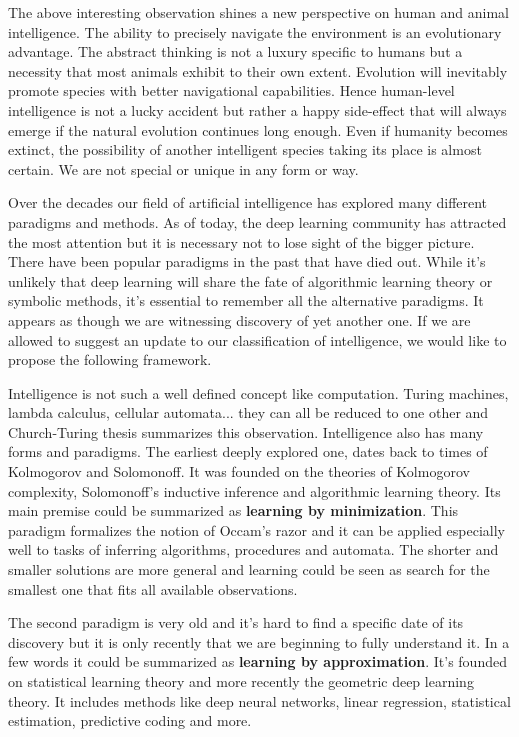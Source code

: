 \documentclass[12pt]{article}
\begin{document}
The above interesting observation shines a new perspective on human and animal intelligence. The ability to precisely navigate the environment is an evolutionary advantage. The abstract thinking is not a luxury specific to humans but a necessity that most animals exhibit to their own extent. Evolution will inevitably promote species with better navigational capabilities. Hence human-level intelligence is not a lucky accident but rather a happy side-effect that will always emerge if the natural evolution continues long enough. Even if humanity becomes extinct, the possibility of another intelligent species  taking its place is almost certain. We are not special or unique in any form or way.

Over the decades our field of artificial intelligence has explored many different paradigms
and methods. As of today, the deep learning community has attracted the most attention but it is necessary not to lose sight of the bigger picture. There have been popular paradigms in the past that have died out. While it's unlikely that deep learning will share the fate of algorithmic learning theory or symbolic methods, it's essential to remember all the alternative paradigms. It appears as though we are witnessing discovery of yet another one.
If we are allowed to suggest an update to our classification of intelligence, we would like to propose the following framework.

Intelligence is not such a well defined concept like computation. Turing machines, lambda calculus, cellular automata... they can all be reduced to one other and Church-Turing thesis
summarizes this observation. Intelligence also has many forms and paradigms. The earliest deeply explored one, dates back to times of Kolmogorov and Solomonoff. It was founded on the theories of Kolmogorov complexity, Solomonoff's inductive inference and algorithmic learning theory. Its main premise could be summarized as \textbf{learning by minimization}. This paradigm formalizes the notion of Occam's razor and it can be applied especially well to tasks of inferring algorithms, procedures and automata.  The shorter and smaller solutions are more general and learning could be seen as search for the smallest one that fits all available observations.

The second paradigm is very old and it's hard to find a specific date of its discovery but it is only recently that we are beginning to fully understand it. In a few words it could be summarized as \textbf{learning by approximation}. It's founded on statistical learning theory and more recently the geometric deep learning theory. It includes methods like deep neural networks, linear regression, statistical estimation, predictive coding and more. 
\end{document}
